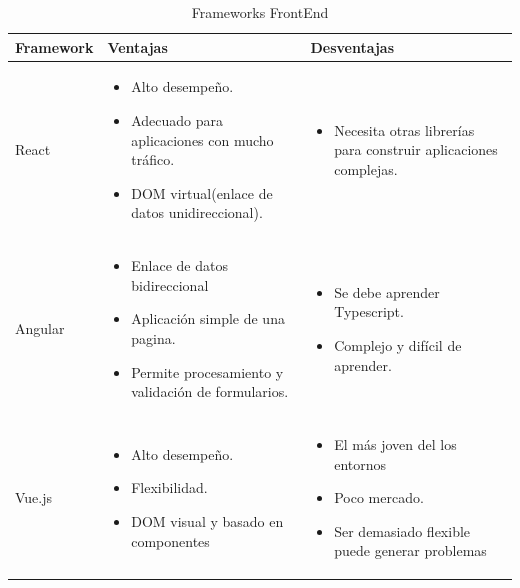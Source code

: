 \documentclass[a4paper,12 pt]{article}
\begin{document}
\begin{table}[H]
    \centering
    \small{
    \begin{tabular}{|M{2.5cm}|M{6.5cm}|M{6.5cm}|}
        \hline
        \textbf{Framework}  &\textbf{Ventajas}   &\textbf{Desventajas}\\
        \hline 
            React   &
            \begin{itemize}
                \item Alto desempeño.
                \item Adecuado para aplicaciones con mucho tráfico.
                \item DOM virtual(enlace de datos unidireccional).
            \end{itemize}   &
            \begin{itemize}
                \item Necesita otras librerías para construir aplicaciones complejas.
            \end{itemize}
            \\
        \hline
            Angular & 
            \begin{itemize}
                \item Enlace de datos bidireccional
                \item Aplicación simple de una pagina.
                \item Permite procesamiento y validación de formularios.

            \end{itemize}   &
            \begin{itemize}
                \item Se debe aprender Typescript.
                \item Complejo y difícil de aprender.
            \end{itemize}
            \\
        \hline
            Vue.js  & 
            \begin{itemize}
                \item Alto desempeño. 
                \item Flexibilidad. 
                \item DOM visual y basado en componentes
            \end{itemize}   &
            \begin{itemize}
                \item El más joven del los entornos 
                \item Poco mercado.
                \item Ser demasiado flexible puede generar problemas
            \end{itemize}
            \\
        \hline
            
    \end{tabular}
    \caption{Frameworks FrontEnd}
    }
\end{table}{}
\end{document}
